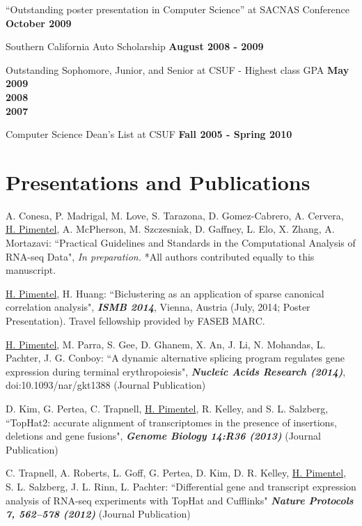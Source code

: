 \documentclass[margin,line]{res}
\begin{document}
\begin{resume}
``Outstanding poster presentation in Computer Science'' at SACNAS
Conference \hfill {\bf October 2009}

Southern California Auto Scholarship \hfill {\bf August 2008 - 2009}

\vspace*{1.5mm}
Outstanding Sophomore, Junior, and Senior at CSUF - Highest class GPA
\hfill {\bf May 2009}
\\
\hspace*{2cm} \hfill \textbf{2008} \\
\hspace*{2cm} \hfill \textbf{2007}

\vspace*{1.5mm}
Computer Science Dean's List at CSUF \hfill {\bf Fall 2005 - Spring 2010}

\section{\sc Presentations and Publications}

A. Conesa, P. Madrigal, M. Love, S. Tarazona, D. Gomez-Cabrero, A. Cervera,
\underline{H. Pimentel}, A. McPherson, M. Szczesniak, D. Gaffney, L. Elo, X.
Zhang, A. Mortazavi: ``Practical Guidelines and Standards in the Computational
Analysis of RNA-seq Data", {\emph{In preparation.}} *All authors contributed
equally to this manuscript.

\underline{H. Pimentel}, H. Huang: ``Biclustering as an application of sparse
canonical correlation analysis", {\bf \emph{ISMB 2014}}, Vienna, Austria (July,
2014; Poster Presentation). Travel fellowship provided by FASEB MARC.

\underline{H. Pimentel}, M. Parra, S. Gee, D. Ghanem, X. An, J. Li, N.
Mohandas, L. Pachter, J. G. Conboy: ``A dynamic alternative splicing program
regulates gene expression during terminal erythropoiesis", {\bf \emph{Nucleic
    Acids Research (2014)}}, doi:10.1093/nar/gkt1388 (Journal Publication)

D. Kim, G. Pertea, C. Trapnell, \underline{H. Pimentel}, R. Kelley, and S.
L. Salzberg, ``TopHat2: accurate alignment of transcriptomes in the presence of
insertions, deletions and gene fusions", {\bf \emph{Genome Biology
    14:R36 (2013)}} (Journal Publication)

C. Trapnell, A. Roberts, L. Goff, G. Pertea, D. Kim, D. R. Kelley,
\underline{H. Pimentel}, S. L. Salzberg, J. L. Rinn, L. Pachter: ``Differential
gene and transcript expression analysis of RNA-seq experiments with TopHat and
Cufflinks" {\bf \emph{Nature Protocols 7, 562–578 (2012)}} (Journal Publication)


\end{resume}
\end{document}
